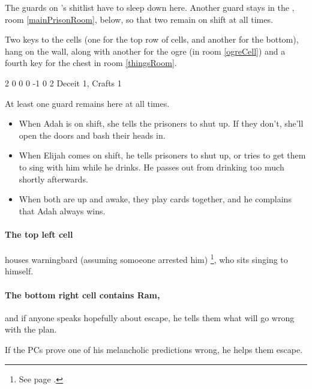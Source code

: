 \begin{multicols}{2}
The guards on 's shitlist have to sleep down here.
Another guard stays in the , room \ref{mainPrisonRoom}, below, so that two remain on shift at all times.

Two keys to the cells (one for the top row of cells, and another for the bottom), hang on the wall, along with another for the ogre (in room \ref{ogreCell}) and a fourth key for the chest in room \ref{thingsRoom}.

{2}%
{0}%
{{0}%
{0}%
{-1}}%
{0}%
{2}%
{
  Deceit 1, Crafts 1
  \knacks{\brawler, \berserker}
}%
{\shortsword}%
{}



At least one guard remains here at all times.
\begin{itemize}

  \item
  When Adah is on shift, she tells the prisoners to shut up.
  If they don't, she'll open the doors and bash their heads in.
  \item
  When Elijah comes on shift, he tells prisoners to shut up, or tries to get them to sing with him while he drinks.
  He passes out from drinking too much shortly afterwards.
  \item
  When both are up and awake, they play cards together, and he complains that Adah always wins.

\end{itemize}



\paragraph{The top left cell}
houses \gls{warningbard} (assuming somoeone arrested him)%
\footnote{See page \pageref{warningbard}.},
who sits singing to himself.

\paragraph{The bottom right cell contains Ram,}
and if anyone speaks hopefully about escape, he tells them what will go wrong with the plan.

If the PCs prove one of his melancholic predictions wrong, he helps them escape.


\end{multicols}
